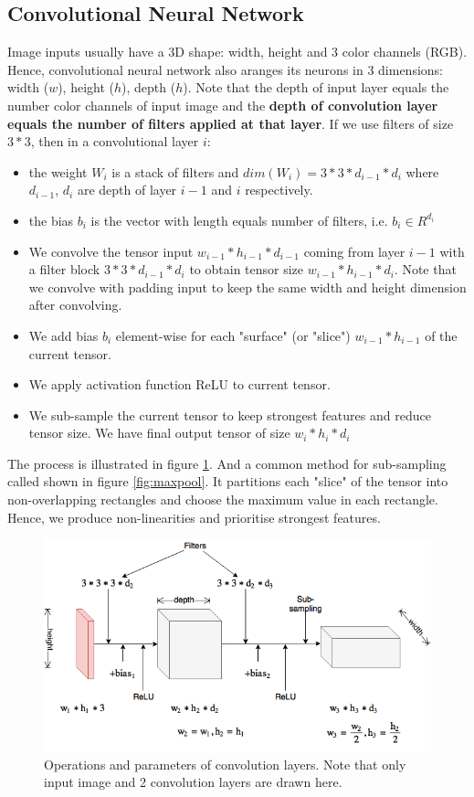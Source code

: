 \subsection{Convolutional Neural Network}
Image inputs usually have a 3D shape: width, height and 3 color channels (RGB). Hence, convolutional neural network also aranges its neurons in 3 dimensions: width ($w$), height ($h$), depth ($h$). Note that the depth of input layer equals the number color channels of input image and the \textbf{depth of convolution layer equals the number of filters applied at that layer}. If we use filters of size $3*3$, then in a convolutional layer $i$:
\begin{itemize}
	\item the weight $W_i$ is a stack of filters and $dim(W_i) = 3*3*d_{i-1}*d_i$ where $d_{i-1}$, $d_i$ are depth of layer $i-1$ and $i$ respectively.
	\item the bias $b_i$ is the vector with length equals number of filters, i.e. $b_i \in R^{d_i}$
	\item We convolve the tensor input $w_{i-1}*h_{i-1}*d_{i-1}$ coming from layer $i-1$ with a filter block $3*3*d_{i-1}*d_{i}$ to obtain tensor size $w_{i-1}*h_{i-1}*d_{i}$. Note that we convolve with padding input to keep the same width and height dimension after convolving.
	\item We add bias $b_i$ element-wise for each "surface" (or "slice") $w_{i-1}*h_{i-1}$ of the current tensor.
	\item We apply activation function ReLU to current tensor.
	\item We sub-sample the current tensor to keep strongest features and reduce tensor size. We have final output tensor of size $w_i * h_i *d_i$
\end{itemize}  
The process is illustrated in figure \ref{fig:convNetsimple}. And a common method for sub-sampling called  shown in figure \ref{fig:maxpool}. It partitions each "slice" of the tensor into non-overlapping rectangles and choose the maximum value in each rectangle. Hence, we produce non-linearities and prioritise strongest features.
\begin{figure}[tb]
	\centering
	\includegraphics[width=0.9\hsize]{./figures/convNetsimple}
	\caption{Operations and parameters of convolution layers. Note that only input image and 2 convolution layers are drawn here.}
	\label{fig:convNetsimple}
\end{figure}
